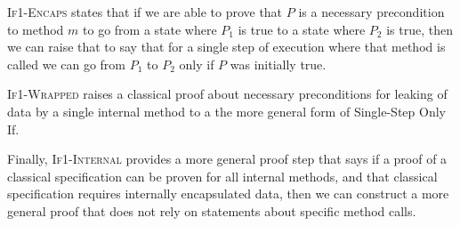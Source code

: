 \textsc{If1-Encaps} states that if we are able to prove that $P$ is 
a necessary precondition to method $m$ to go from a state where 
$P_1$ is true to a state where $P_2$ is true, then we can raise 
that to say that for a single step of execution where that method 
is called we can go from $P_1$ to $P_2$ only if $P$ was initially true.

\textsc{If1-Wrapped} raises a classical proof about necessary preconditions 
for leaking of data by a single internal method to a the more general form of 
Single-Step Only If.

Finally, \textsc{If1-Internal} provides a more general proof step that says
if a proof of a classical specification can be proven for all internal 
methods, and that classical specification requires internally encapsulated
data, then we can construct a more general proof that does not rely on
statements about specific method calls.


